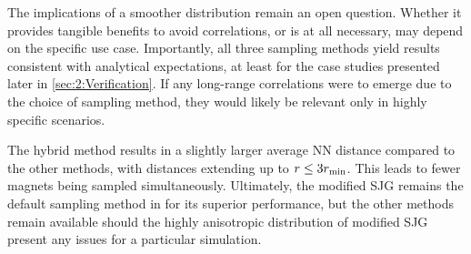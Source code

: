 The implications of a smoother distribution remain an open question.
Whether it provides tangible benefits to avoid correlations, or is at all necessary, may depend on the specific use case.
Importantly, all three sampling methods yield results consistent with analytical expectations, at least for the case studies presented later in \cref{sec:2:Verification}.
If any long-range correlations were to emerge due to the choice of sampling method, they would likely be relevant only in highly specific scenarios. \par
The hybrid method results in a slightly larger average NN distance compared to the other methods, with distances extending up to $r \leq 3 r_\mathrm{min}$.
This leads to fewer magnets being sampled simultaneously.
Ultimately, the modified SJG remains the default sampling method in \hotspice for its superior performance, but the other methods remain available should the highly anisotropic distribution of modified SJG present any issues for a particular simulation.
